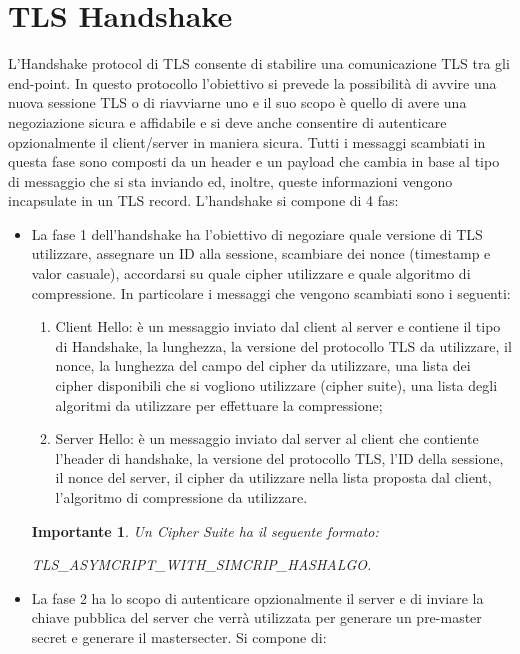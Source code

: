 \documentclass[a4paper,draft]{article}
\newtheorem*{importante}{\textbf{Importante}\newline}
\begin{document}
\section{TLS Handshake}
L'Handshake protocol di TLS consente di stabilire una comunicazione TLS tra gli end-point\@. In questo protocollo l'obiettivo si prevede la possibilità di avvire una nuova sessione TLS o di riavviarne uno e il suo scopo è quello di avere una negoziazione sicura e affidabile e si deve anche consentire di autenticare opzionalmente il client/server in maniera sicura\@. Tutti i messaggi scambiati in questa fase sono composti da un header e un payload che cambia in base al tipo di messaggio che si sta inviando ed, inoltre, queste informazioni vengono incapsulate in un TLS record.\newline
L'handshake si compone di 4 fas:\begin{itemize}
    \item La fase 1 dell'handshake ha l'obiettivo di negoziare quale versione di TLS utilizzare, assegnare un ID alla sessione, scambiare dei nonce (timestamp e valor casuale), accordarsi su quale cipher utilizzare e quale algoritmo di compressione\@. In particolare i messaggi che vengono scambiati sono i seguenti:\begin{enumerate}
        \item Client Hello: è un messaggio inviato dal client al server e contiene il tipo di Handshake, la lunghezza, la versione del protocollo TLS da utilizzare, il nonce, la lunghezza del campo del cipher da utilizzare, una lista dei cipher disponibili che si vogliono utilizzare (cipher suite), una lista degli algoritmi da utilizzare per effettuare la compressione;
        \item Server Hello: è un messaggio inviato dal server al client che contiente l'header di handshake, la versione del protocollo TLS, l'ID della sessione, il nonce del server, il cipher da utilizzare nella lista proposta dal client, l'algoritmo di compressione da utilizzare\@.
    \end{enumerate}
    \begin{importante}
        Un Cipher Suite ha il seguente formato:\begin{center}
            TLS\_ASYMCRIPT\_WITH\_SIMCRIP\_HASHALGO\@.
        \end{center}
    \end{importante}
    \item La fase 2 ha lo scopo di autenticare opzionalmente il server e di inviare la chiave pubblica del server che verrà utilizzata per generare un pre-master secret e generare il mastersecter\@. Si compone di:\begin{enumerate}

\end{enumerate}
\end{itemize}
\end{document}
